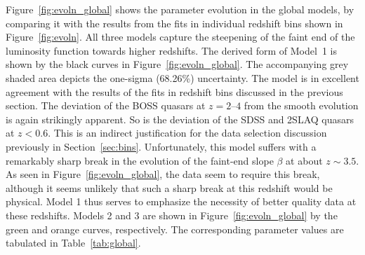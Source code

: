 \documentclass[fleqn,usenatbib]{mnras}
\begin{document}
Figure~\ref{fig:evoln_global} shows the parameter evolution in the
global models, by comparing it with the results from the fits in
individual redshift bins shown in Figure~\ref{fig:evoln}.  All three
models capture the steepening of the faint end of the luminosity
function towards higher redshifts.  The derived form of Model~1 is
shown by the black curves in Figure~\ref{fig:evoln_global}.  The
accompanying grey shaded area depicts the one-sigma (68.26\%)
uncertainty.  The model is in excellent agreement with the results of
the fits in redshift bins discussed in the previous section.
The
deviation of the BOSS quasars at $z=2$--$4$ from the smooth evolution
is again strikingly apparent.  So is
the deviation of the SDSS and
2SLAQ quasars at $z<0.6$.  This is an indirect justification for the
data selection discussion previously in Section~\ref{sec:bins}.
Unfortunately, this model suffers
with a remarkably sharp break in the
evolution of the faint-end slope $\beta$ at about $z\sim 3.5$.  As
seen in Figure~\ref{fig:evoln_global}, the data seem to require this
break, although it seems unlikely that such a sharp break at this
redshift would be physical.  Model 1 thus serves to emphasize the
necessity of better quality data at these redshifts.  Models 2 and 3
are shown in Figure~\ref{fig:evoln_global} by the green and orange
curves, respectively.  The corresponding parameter values are
tabulated in Table~\ref{tab:global}.
\end{document}
